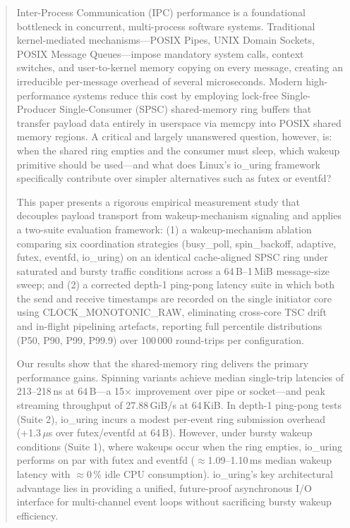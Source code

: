 \documentclass[10pt,conference]{IEEEtran}
\begin{document}
\begin{abstract}
Inter-Process Communication (IPC) performance is a foundational bottleneck in
concurrent, multi-process software systems. Traditional kernel-mediated
mechanisms---POSIX Pipes, UNIX Domain Sockets, POSIX Message Queues---impose
mandatory system calls, context switches, and user-to-kernel memory copying on
every message, creating an irreducible per-message overhead of several
microseconds. Modern high-performance systems reduce this cost by employing
lock-free Single-Producer Single-Consumer (SPSC) shared-memory ring buffers
that transfer payload data entirely in userspace via memcpy into POSIX
shared memory regions. A critical and largely unanswered question, however,
is: when the shared ring empties and the consumer must sleep, which
wakeup primitive should be used---and what does Linux's
io\_uring framework specifically contribute over simpler
alternatives such as futex or eventfd?

This paper presents a rigorous empirical measurement study that decouples
payload transport from wakeup-mechanism signaling and applies a two-suite
evaluation framework: (1) a wakeup-mechanism ablation comparing six
coordination strategies (busy\_poll, spin\_backoff,
adaptive, futex, eventfd, io\_uring) on an
identical cache-aligned SPSC ring under saturated and bursty traffic
conditions across a 64\,B--1\,MiB message-size sweep; and (2) a
corrected depth-1 ping-pong latency suite in which both the send and
receive timestamps are recorded on the single initiator core using
CLOCK\_MONOTONIC\_RAW, eliminating cross-core TSC drift and
in-flight pipelining artefacts, reporting full percentile distributions
(P50, P90, P99, P99.9) over 100\,000 round-trips per configuration.

Our results show that the shared-memory ring delivers the primary performance
gains. Spinning variants achieve median single-trip latencies of
213--218\,ns at 64\,B---a 15$\times$ improvement over pipe or
socket---and peak streaming throughput of 27.88\,GiB/s at 64\,KiB.
In depth-1 ping-pong tests (Suite 2), io\_uring incurs a modest per-event
ring submission overhead (+1.3\,$\mu$s over futex/eventfd at 64\,B).
However, under bursty wakeup conditions (Suite 1), where wakeups occur when the
ring empties, io\_uring performs on par with futex and
eventfd ($\approx$1.09--1.10\,ms median wakeup latency with
$\approx$0\,\% idle CPU consumption).
io\_uring's key architectural advantage lies in providing a unified,
future-proof asynchronous I/O interface for multi-channel event loops without
sacrificing bursty wakeup efficiency.
\end{abstract}
\end{document}
